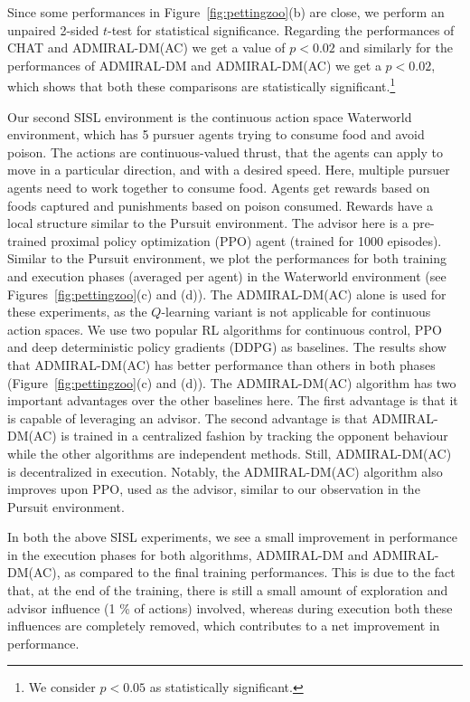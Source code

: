 \documentclass[jair, twoside,11pt,theapa]{article}
\begin{document}
Since some performances in Figure~\ref{fig:pettingzoo}(b) are close, we perform an unpaired 2-sided $t$-test for statistical significance. Regarding the performances of CHAT and ADMIRAL-DM(AC) we get a value of $p < 0.02$ and similarly for the performances of ADMIRAL-DM and ADMIRAL-DM(AC) we get a $p < 0.02$, which shows that both these comparisons are statistically significant.\footnote{We consider $p < 0.05$ as statistically significant.}

Our second SISL environment is the continuous action space Waterworld environment, which has 5 pursuer agents trying to consume food and avoid poison. The actions are continuous-valued thrust, that the agents can apply to move in a particular direction, and with a desired speed. Here, multiple pursuer agents need to work together to consume food. 
Agents get rewards based on foods captured and punishments based on poison consumed. Rewards have a local structure similar to the Pursuit environment. 
The advisor here is a pre-trained proximal policy optimization (PPO) \citep{schulman2017proximal} agent (trained for 1000 episodes). 
Similar to the Pursuit environment, we plot the performances for both training and execution phases (averaged per agent) in the Waterworld environment (see Figures~\ref{fig:pettingzoo}(c) and (d)). 
The ADMIRAL-DM(AC) alone is used for these experiments, as the $Q$-learning variant is not applicable for continuous action spaces. 
We use two popular RL algorithms for continuous control, PPO and deep deterministic policy gradients (DDPG) \citep{lillicrap2015continuous} as baselines. 
The results show that ADMIRAL-DM(AC) has better performance than others in both phases (Figure~\ref{fig:pettingzoo}(c) and (d)). The ADMIRAL-DM(AC) algorithm has two important advantages over the other baselines here. The first advantage is that it is capable of leveraging an advisor.  The second advantage is that ADMIRAL-DM(AC) is trained in a centralized fashion by tracking the opponent behaviour while the other algorithms are independent methods. Still, ADMIRAL-DM(AC) is decentralized in execution. Notably, the ADMIRAL-DM(AC) algorithm also improves upon PPO, used as the advisor, similar to our observation in the Pursuit environment. 

In both the above SISL experiments, we see a small improvement in performance in the execution phases for both algorithms, ADMIRAL-DM and ADMIRAL-DM(AC), as compared to the final training performances. This is due to the fact that, at the end of the training, there is still a small amount of exploration and advisor influence (1 \% of actions) involved, whereas during execution both these influences are completely removed, which contributes to a net improvement in performance. 
\end{document}
